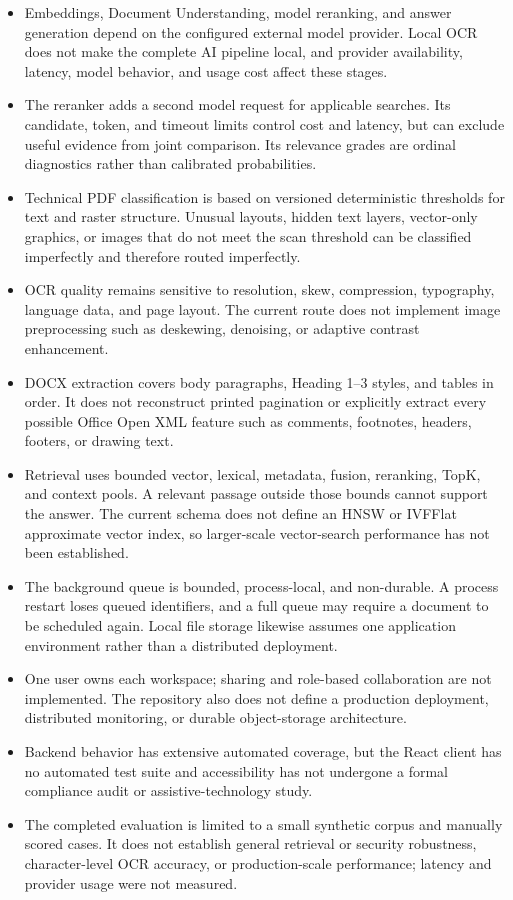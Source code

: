 \begin{itemize}
    \item Embeddings, Document Understanding, model reranking, and answer generation depend on the configured external model provider. Local OCR does not make the complete AI pipeline local, and provider availability, latency, model behavior, and usage cost affect these stages.
    \item The reranker adds a second model request for applicable searches. Its candidate, token, and timeout limits control cost and latency, but can exclude useful evidence from joint comparison. Its relevance grades are ordinal diagnostics rather than calibrated probabilities.
    \item Technical PDF classification is based on versioned deterministic thresholds for text and raster structure. Unusual layouts, hidden text layers, vector-only graphics, or images that do not meet the scan threshold can be classified imperfectly and therefore routed imperfectly.
    \item OCR quality remains sensitive to resolution, skew, compression, typography, language data, and page layout. The current route does not implement image preprocessing such as deskewing, denoising, or adaptive contrast enhancement.
    \item DOCX extraction covers body paragraphs, Heading 1--3 styles, and tables in order. It does not reconstruct printed pagination or explicitly extract every possible Office Open XML feature such as comments, footnotes, headers, footers, or drawing text.
    \item Retrieval uses bounded vector, lexical, metadata, fusion, reranking, TopK, and context pools. A relevant passage outside those bounds cannot support the answer. The current schema does not define an HNSW or IVFFlat approximate vector index, so larger-scale vector-search performance has not been established.
    \item The background queue is bounded, process-local, and non-durable. A process restart loses queued identifiers, and a full queue may require a document to be scheduled again. Local file storage likewise assumes one application environment rather than a distributed deployment.
    \item One user owns each workspace; sharing and role-based collaboration are not implemented. The repository also does not define a production deployment, distributed monitoring, or durable object-storage architecture.
    \item Backend behavior has extensive automated coverage, but the React client has no automated test suite and accessibility has not undergone a formal compliance audit or assistive-technology study.
    \item The completed evaluation is limited to a small synthetic corpus and manually scored cases. It does not establish general retrieval or security robustness, character-level OCR accuracy, or production-scale performance; latency and provider usage were not measured.
\end{itemize}

